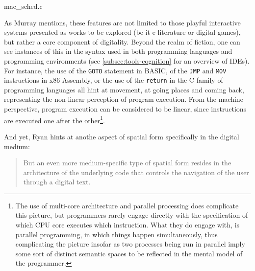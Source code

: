 \begin{listing}
    \inputminted[]{c}{./corpus/mac_sched.c}
    \caption{mac\_sched.c}
    \label{code:mac_sched}
\end{listing}


As Murray mentions, these features are not limited to those playful interactive systems presented as works to be explored (be it e-literature or digital games), but rather a core component of digitality. Beyond the realm of fiction, one can see instances of this in the syntax used in both programming languages and programming environments (see \ref{subsec:tools-cognition} for an overview of IDEs). For instance, the use of the \lstinline{GOTO} statement in BASIC, of the \lstinline{JMP} and \lstinline{MOV} instructions in x86 Assembly, or the use of the \lstinline{return} in the C family of programming languages all hint at movement, at going places and coming back, representing the non-linear perception of program execution. From the machine perspective, program execution can be considered to be linear, since instructions are executed one after the other\footnote{The use of multi-core architecture and parallel processing does complicate this picture, but programmers rarely engage directly with the specification of which CPU core executes which instruction. What they do engage with, is parallel programming, in which things happen simultaneously, thus complicating the picture insofar as two processes being run in parallel imply some sort of distinct semantic spaces to be reflected in the mental model of the programmer.}.

And yet, Ryan hints at anothe aspect of spatial form specifically in the digital medium:

\begin{quote}
    But an even more medium-specific type of spatial form resides in the architecture of the underlying code that controls the navigation of the user through a digital text. \citep{ryan_four_2021}
\end{quote}

